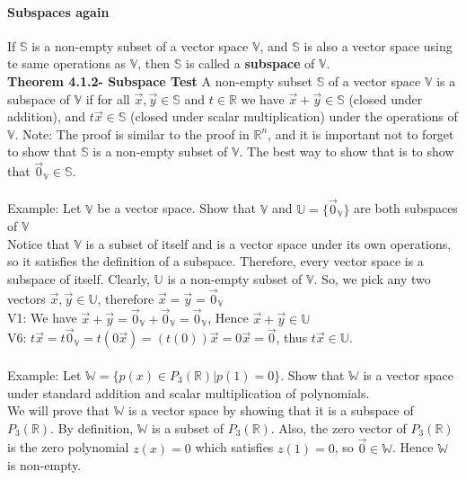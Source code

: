 \documentclass[10pt,letter]{article}
\begin{document}
\paragraph{Subspaces again} If $\mathbb{S}$ is a non-empty subset of a vector space $\mathbb{V}$, and $\mathbb{S}$ is also a vector space using te same operations as $\mathbb{V}$, then $\mathbb{S}$ is called a \textbf{subspace} of $\mathbb{V}$. \\ 
\textbf{Theorem 4.1.2- Subspace Test} A non-empty subset $\mathbb{S}$ of a vector space $\mathbb{V}$ is a subspace of $\mathbb{V}$ if for all $\vec{x},\vec{y}\in\mathbb{S}$ and $t\in\mathbb{R}$ we have $\vec{x}+\vec{y}\in\mathbb{S}$ (closed under addition), and $t\vec{x}\in\mathbb{S}$ (closed under scalar multiplication) under the operations of $\mathbb{V}$. Note: The proof is similar to the proof in $\mathbb{R}^n$, and it is important not to forget to show that $\mathbb{S}$ is a non-empty subset of $\mathbb{V}$. The best way to show that is to show that $\vec{0}_\mathbb{V}\in\mathbb{S}$. \\ \\ 
Example: Let $\mathbb{V}$ be a vector space. Show that $\mathbb{V}$ and $\mathbb{U}=\{\vec{0}_\mathbb{V}\}$ are both subspaces of $\mathbb{V}$ \\ 
Notice that $\mathbb{V}$ is a subset of itself and is a vector space under its own operations, so it satisfies the definition of a subspace. Therefore, every vector space is a subspace of itself. Clearly, $\mathbb{U}$ is a non-empty subset of $\mathbb{V}$. So, we pick any two vectors $\vec{x},\vec{y}\in\mathbb{U}$, therefore $\vec{x}=\vec{y}=\vec{0}_\mathbb{V}$ \\ 
V1: We have $\vec{x}+\vec{y}=\vec{0}_\mathbb{V}+\vec{0}_\mathbb{V}=\vec{0}_\mathbb{V}$, Hence $\vec{x}+\vec{y}\in\mathbb{U}$ \\ 
V6: $t\vec{x}=t\vec{0}_\mathbb{V}=t(0\vec{x})=(t(0))\vec{x}=0\vec{x}=\vec{0}$, thus $t\vec{x}\in\mathbb{U}$. \\ \\
Example: Let $\mathbb{W}=\{p(x)\in P_3(\mathbb{R})|p(1)=0\}$. Show that $\mathbb{W}$ is a vector space under standard addition and scalar multiplication of polynomials. \\ 
We will prove that $\mathbb{W}$ is a vector space by showing that it is a subspace of $P_3(\mathbb{R})$. By definition, $\mathbb{W}$ is a subset of $P_3(\mathbb{R})$. Also, the zero vector of $P_3(\mathbb{R})$ is the zero polynomial $z(x)=0$ which satisfies $z(1)=0$, so $\vec{0}\in\mathbb{W}$. Hence $\mathbb{W}$ is non-empty. \\ 
\end{document}
